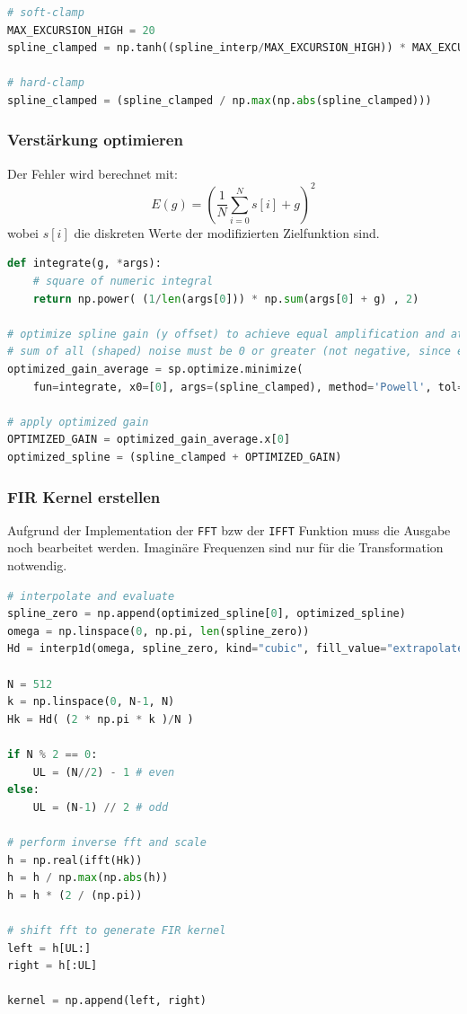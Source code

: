 \begin{lstlisting}[language=Python]
# soft-clamp
MAX_EXCURSION_HIGH = 20
spline_clamped = np.tanh((spline_interp/MAX_EXCURSION_HIGH)) * MAX_EXCURSION_HIGH

# hard-clamp
spline_clamped = (spline_clamped / np.max(np.abs(spline_clamped)))
\end{lstlisting}

\hypertarget{verstuxe4rkung-optimieren}{%
\subsubsection{Verstärkung optimieren}\label{verstuxe4rkung-optimieren}}

Der Fehler wird berechnet mit: \[
E(g) = \left( \frac{1}{N} \sum_{i=0}^{N} s[i] + g \right)^2
\] wobei \(s[i]\) die diskreten Werte der modifizierten Zielfunktion
sind.

\begin{lstlisting}[language=Python]
def integrate(g, *args):
    # square of numeric integral
    return np.power( (1/len(args[0])) * np.sum(args[0] + g) , 2)

# optimize spline gain (y offset) to achieve equal amplification and attenuation
# sum of all (shaped) noise must be 0 or greater (not negative, since energy musnt be lost)
optimized_gain_average = sp.optimize.minimize(
    fun=integrate, x0=[0], args=(spline_clamped), method='Powell', tol=1e-16, options={'disp': False})

# apply optimized gain
OPTIMIZED_GAIN = optimized_gain_average.x[0]
optimized_spline = (spline_clamped + OPTIMIZED_GAIN)
\end{lstlisting}

\hypertarget{fir-kernel-erstellen}{%
\subsubsection{FIR Kernel erstellen}\label{fir-kernel-erstellen}}

Aufgrund der Implementation der \texttt{FFT} bzw der \texttt{IFFT}
Funktion muss die Ausgabe noch bearbeitet werden. Imaginäre Frequenzen
sind nur für die Transformation notwendig.

\begin{lstlisting}[language=Python]
# interpolate and evaluate
spline_zero = np.append(optimized_spline[0], optimized_spline)
omega = np.linspace(0, np.pi, len(spline_zero))
Hd = interp1d(omega, spline_zero, kind="cubic", fill_value="extrapolate", bounds_error=False)

N = 512
k = np.linspace(0, N-1, N)
Hk = Hd( (2 * np.pi * k )/N )

if N % 2 == 0:
    UL = (N//2) - 1 # even
else:
    UL = (N-1) // 2 # odd

# perform inverse fft and scale
h = np.real(ifft(Hk))
h = h / np.max(np.abs(h))
h = h * (2 / (np.pi))

# shift fft to generate FIR kernel
left = h[UL:]
right = h[:UL]

kernel = np.append(left, right)
\end{lstlisting}

